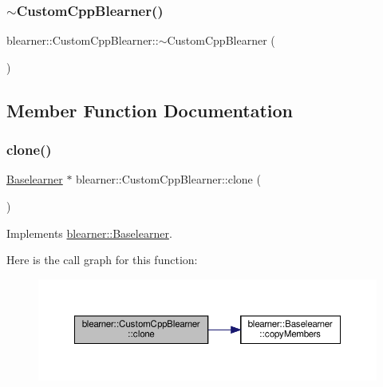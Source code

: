 \subsubsection{\texorpdfstring{$\sim$\+Custom\+Cpp\+Blearner()}{~CustomCppBlearner()}}
{\footnotesize\ttfamily blearner\+::\+Custom\+Cpp\+Blearner\+::$\sim$\+Custom\+Cpp\+Blearner (\begin{DoxyParamCaption}{ }\end{DoxyParamCaption})}



\subsection{Member Function Documentation}
\mbox{\label{classblearner_1_1_custom_cpp_blearner_a8b76705131d397974cd208fdcfd70496}} 
\subsubsection{\texorpdfstring{clone()}{clone()}}
{\footnotesize\ttfamily \hyperlink{classblearner_1_1_baselearner}{Baselearner} $\ast$ blearner\+::\+Custom\+Cpp\+Blearner\+::clone (\begin{DoxyParamCaption}{ }\end{DoxyParamCaption})\hspace{0.3cm}{\ttfamily [virtual]}}



Implements \hyperlink{classblearner_1_1_baselearner_a8e12c6739f085917a7d2da6570c51a21}{blearner\+::\+Baselearner}.

Here is the call graph for this function\+:\nopagebreak
\begin{figure}[H]
\begin{center}
\leavevmode
\includegraphics[width=350pt]{classblearner_1_1_custom_cpp_blearner_a8b76705131d397974cd208fdcfd70496_cgraph}
\end{center}
\end{figure}
\mbox{\label{classblearner_1_1_custom_cpp_blearner_a14607a1d1f312d46a3024b37085c146d}} 
